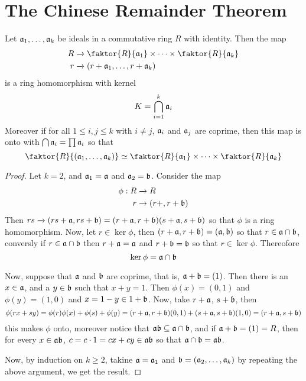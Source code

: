 \section{The Chinese Remainder Theorem}
\label{section_5.8}

\begin{theorem}\label{theorem_5.8.1}
  Let $\af_1, \dots, \af_k$ be ideals in a commutative ring $R$ with identity.
  Then the map
  \begin{align*}
    R   &   \xrightarrow{} \faktor{R}{\af_1} \times \dots \times
    \faktor{R}{\af_k} \\
    r   &   \xrightarrow{} (r+\af_1, \dots, r+\af_k)    \\
  \end{align*}
  is a ring homomorphism with kernel
  \begin{equation*}
    K=\bigcap_{i=1}^k{\af_i}
  \end{equation*}
  Moreover if for all $1 \leq i,j \leq k$ with  $i \neq j$,  $\af_i$ and  $\af_j$
  are coprime, then this map is onto with  $\bigcap{\af_i}=\prod{\af_i}$ so that
  \begin{equation*}
    \faktor{R}{(\af_1, \dots, \af_k)} \simeq \faktor{R}{\af_1} \times \dots
    \times \faktor{R}{\af_k}
  \end{equation*}
\end{theorem}
\begin{proof}
  Let $k=2$, and  $\af_1=\af$ and $\af_2=\bf$. Consider the map
  \begin{align*}
    \phi:R  &   \xrightarrow{} R  \\
    r   &   \xrightarrow{}  (r+,r+\bf)   \\
  \end{align*}
  Then $rs \xrightarrow{} (rs+\af,rs+\bf)=(r+\af,r+\bf)(s+\af,s+\bf)$ so that $\phi$ is a
  ring homomorphism. Now, let  $r \in \ker{\phi}$, then $(r+\af,r+\bf)=(\af,\bf)$ so
  that $r \in \af \cap \bf$, conversly if  $r \in \af \cap \bf$ then  $r+\af=\af$ and
  $r+\bf=\bf$ so that  $r \in \ker{\phi}$. Thereofore
  \begin{equation*}
    \ker{\phi}=\af \cap \bf
  \end{equation*}

  Now, suppose that $\af$ and  $\bf$ are coprime, that is, $\af+\bf=(1)$. Then there
  is an  $x \in \af$, and a  $y \in \bf$ such that  $x+y=1$. Then $\phi(x)=(0,1)$
  and $\phi(y)=(1,0)$ and $x=1-y \in 1+\bf$. Now, take  $r+\af$,  $s+\bf$, then
  \begin{equation*}
    \phi(rx+sy)=\phi(r)\phi(x)+\phi(s)+\phi(y)=(r+\af,r+\bf)(0,1)+(s+\af,s+\bf)(1,0)
    =(r+\af,s+\bf)
  \end{equation*}
  this makes $\phi$ onto, moreover notice that  $\af\bf \subseteq \af \cap \bf$, and
  if  $\af+\bf=(1)=R$, then for every $x \in \af\bf$,  $c=c \cdot 1=cx+cy \in \af\bf$ so
  that  $\af \cap \bf=\af\bf$.

  Now, by induction on $k \geq 2$, takine  $\af=\af_1$ and
  $\bf=(\af_2, \dots, \af_k)$ by repeating the above argument, we get
  the result.
\end{proof}
